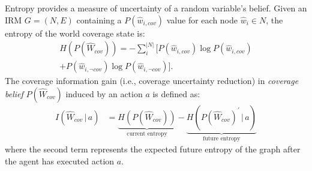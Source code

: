 \documentclass[letterpaper]{article} %
\newcommand{\ph}[1]{{\textbf{#1}:}} %
\begin{document}
\noindent
Entropy provides a measure of uncertainty of a random variable's belief. Given an IRM $G = (N, E)$ containing a $P(\hat{w}_{i,cov})$ value for each node $\hat{w}_i \in N$, the entropy of the world coverage state is:
\begin{multline}
  H(P(\hat{W}_{cov})) = - \sum_{i}^{|N|} \Big[ P(\hat{w}_{i,cov}) \log P(\hat{w}_{i,cov}) \\ 
  + P(\hat{w}_{i,\neg cov}) \log P(\hat{w}_{i,\neg cov}) \Big].
\end{multline}
The coverage information gain (i.e., coverage uncertainty reduction) in \textit{coverage belief} $P(\hat{W}_{cov})$ induced by an action $a$ is defined as:
\begin{align}
    I(\hat{W}_{cov} \, | \, a) &= \underbrace{H(P(\hat{W}_{cov}))}_\text{current entropy} - \underbrace{H(P(\hat{W}_{cov})^\prime \, | \, a)}_\text{future entropy}
\end{align}
where the second term represents the expected future entropy of the graph after the agent has executed action $a$. 
\end{document}
